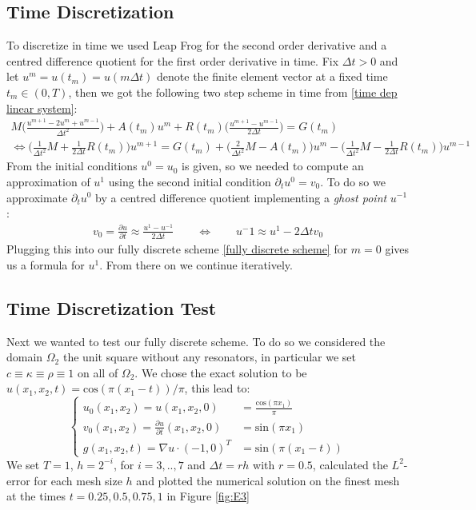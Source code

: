 \documentclass{article}
\begin{document}
\subsection{Time Discretization}
To discretize in time we used Leap Frog for the second order derivative and a centred difference quotient for the first order derivative in time. Fix $\Delta t > 0$ and let $u^m = u(t_m) = u(m \Delta t)$ denote the finite element vector at a fixed time $t_m \in (0,T)$, then we got the following two step scheme in time from \eqref{time dep linear system}:
\begin{equation}\label{fully discrete scheme}
\begin{aligned}
	M\Big(\frac{u^{m+1} - 2u^m +u^{m-1}}{\Delta t^2}\Big) + 
	A(t_m)u^m + R(t_m)\Big(\frac{u^{m+1}-u^{m-1}}{2\Delta t}\Big) = G(t_m) \\
	\Leftrightarrow \Big(\frac{1}{\Delta t^2} M + \frac{1}{2\Delta t} R(t_m)\Big)u^{m+1} = 	
	G(t_m) + \Big(\frac{2}{\Delta t^2} M - A(t_m)\Big)u^m - 
	\Big(\frac{1}{\Delta t^2}M - \frac{1}{2\Delta t}R(t_m)\Big)u^{m-1}
\end{aligned}
\end{equation}
From the initial conditions $u^0 = u_0$ is given, so we needed to compute an approximation of $u^1$ using the second initial condition $\partial_t u^0 = v_0$. To do so we approximate $\partial_t u^0$ by a centred difference quotient implementing a \textit{ghost point} $u^{-1}$:
\begin{align*}
	v_0 = \frac{\partial u}{\partial t} \approx \frac{u^1 - u^{-1}}{2\Delta t} \qquad
	\Leftrightarrow \qquad u^-1 \approx u^1 - 2\Delta t v_0
\end{align*}
Plugging this into our fully discrete scheme \eqref{fully discrete scheme} for $m=0$ gives us a formula for $u^1$. From there on we continue iteratively. 
\subsection{Time Discretization Test}
Next we wanted to test our fully discrete scheme. To do so we considered the domain $\Omega_2$ the unit square without any resonators, in particular we set $c \equiv \kappa \equiv \rho \equiv 1$ on all of $\Omega_2$. We chose the exact solution to be $u(x_1,x_2,t) = \text{cos}(\pi(x_1-t))/\pi$, this lead  to:
\begin{equation*}
\left\{
	\begin{aligned}
		u_0(x_1,x_2) = u(x_1,x_2,0) &= \frac{\text{cos}(\pi x_1)}{\pi} \\
		v_0(x_1,x_2) = \frac{\partial u}{\partial t}(x_1,x_2,0) &= \text{sin}(\pi x_1) \\
		g(x_1,x_2,t) = \nabla u \cdot (-1,0)^T &= \text{sin}(\pi (x_1 - t))
	\end{aligned}
	\right.
\end{equation*}
We set $T = 1$, $h = 2^{-i}$, for $i = 3,..,7$ and $\Delta t = r h$ with $r = 0.5$, calculated the $L^2$-error for each mesh size $h$ and plotted the numerical solution on the finest mesh at the times $t = 0.25, 0.5, 0.75, 1$ in Figure \eqref{fig:E3}
\end{document}
